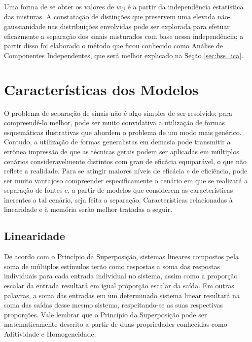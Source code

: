 Uma forma de se obter os valores de $w_{ij}$ é a partir da independência estatística das misturas. A constatação de distinções que preservem uma elevada não-gaussianidade nas distribuições envolvidas pode ser explorada para efetuar eficazmente a separação dos sinais misturados com base nessa independência; a partir disso foi elaborado o método que ficou conhecido como Análise de Componentes Independentes, que será melhor explicado na Seção \ref{sec:bss_ica}.



\section{Características dos Modelos}
\label{sec:bss_characteristics}

O problema de separação de sinais não é algo simples de ser resolvido; para compreendê-lo melhor, pode ser muito convidativa a utilização de formas esquemáticas ilustrativas que abordem o problema de um modo mais genérico. Contudo, a utilização de formas generalistas em demasia pode transmitir a errônea impressão de que as técnicas gerais podem ser aplicadas em múltiplos cenários consideravelmente distintos com grau de eficácia equiparável, o que não reflete a realidade. Para se atingir maiores níveis de eficácia e de eficiência, pode ser muito vantajoso compreender especificamente o cenário em que se realizará a separação de fontes e, a partir de modelos que considerem as características inerentes a tal cenário, seja feita a separação. Características relacionadas à linearidade e à memória serão melhor tratadas a seguir.


\subsection{Linearidade}
\label{subsec:bss_linearity}

De acordo com o Princípio da Superposição, sistemas lineares compostos pela soma de múltiplos estímulos terão como respostas a soma das respostas individuais para cada entrada individual no sistema, assim como a proporção escalar da entrada resultará em igual proporção escalar da saída. Em outras palavras, a soma das entradas em um determinado sistema linear resultará na soma das saídas desse mesmo sistema, respeitando-se as suas respectivas proporções. Vale lembrar que o Princípio da Superposição pode ser matematicamente descrito a partir de duas propriedades conhecidas como Aditividade e Homogeneidade:\\

